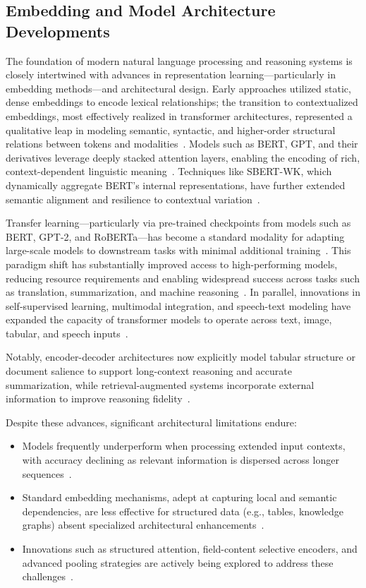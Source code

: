 \documentclass[sigconf]{acmart}
\begin{document}
\subsection{Embedding and Model Architecture Developments}

The foundation of modern natural language processing and reasoning systems is closely intertwined with advances in representation learning---particularly in embedding methods---and architectural design. Early approaches utilized static, dense embeddings to encode lexical relationships; the transition to contextualized embeddings, most effectively realized in transformer architectures, represented a qualitative leap in modeling semantic, syntactic, and higher-order structural relations between tokens and modalities~\cite{ref72,ref74,ref75,ref77}. Models such as BERT, GPT, and their derivatives leverage deeply stacked attention layers, enabling the encoding of rich, context-dependent linguistic meaning~\cite{ref100}. Techniques like SBERT-WK, which dynamically aggregate BERT’s internal representations, have further extended semantic alignment and resilience to contextual variation~\cite{ref74,ref75}.

Transfer learning---particularly via pre-trained checkpoints from models such as BERT, GPT-2, and RoBERTa---has become a standard modality for adapting large-scale models to downstream tasks with minimal additional training~\cite{ref100}. This paradigm shift has substantially improved access to high-performing models, reducing resource requirements and enabling widespread success across tasks such as translation, summarization, and machine reasoning~\cite{ref100}. In parallel, innovations in self-supervised learning, multimodal integration, and speech-text modeling have expanded the capacity of transformer models to operate across text, image, tabular, and speech inputs~\cite{ref72,ref77}.

Notably, encoder-decoder architectures now explicitly model tabular structure or document salience to support long-context reasoning and accurate summarization, while retrieval-augmented systems incorporate external information to improve reasoning fidelity~\cite{ref75,ref77,ref100}. 

Despite these advances, significant architectural limitations endure:

\begin{itemize}
    \item Models frequently underperform when processing extended input contexts, with accuracy declining as relevant information is dispersed across longer sequences~\cite{ref70}.
    \item Standard embedding mechanisms, adept at capturing local and semantic dependencies, are less effective for structured data (e.g., tables, knowledge graphs) absent specialized architectural enhancements~\cite{ref77,ref100}.
    \item Innovations such as structured attention, field-content selective encoders, and advanced pooling strategies are actively being explored to address these challenges~\cite{ref74,ref75,ref77,ref100}.
\end{itemize}
\end{document}
